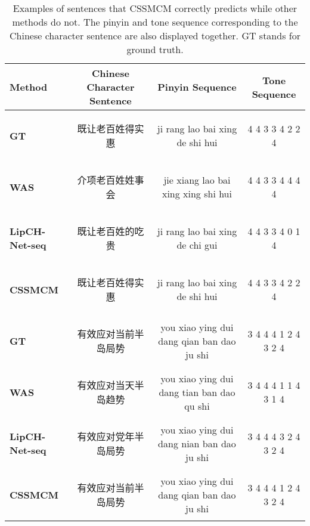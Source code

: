 \documentclass[sigconf]{acmart}
\begin{document}
\begin{table*}[htp]
\small
\centering
\caption {Examples of sentences that CSSMCM correctly predicts while other methods do not. The pinyin and tone sequence corresponding to the Chinese character sentence are also displayed together. GT stands for ground truth.}
\label{table:text_generate}
\begin{tabular}{p{2.7cm}<{\centering}| c | c | c}
\hline
\textbf{Method} & \textbf{Chinese Character Sentence} & \textbf{Pinyin Sequence} & \textbf{Tone Sequence} \\ \hline \hline 

\textbf{GT}   &  \begin{CJK*}{UTF8}{gbsn}既让老百姓得实惠\end{CJK*}   &  ji rang lao bai xing de shi hui     &   4 4 3 3 4 2 2 4  \\ \hline
\textbf{WAS}            &  \begin{CJK*}{UTF8}{gbsn}介项老百姓姓事会\end{CJK*}   &  jie xiang lao bai xing xing shi hui &   4 4 3 3 4 4 4 4\\ \hline
\textbf{LipCH-Net-seq}  &  \begin{CJK*}{UTF8}{gbsn}既让老百姓的吃贵\end{CJK*}   &  ji rang lao bai xing de chi gui     &   4 4 3 3 4 0 1 4\\ \hline
\textbf{CSSMCM}          &  \begin{CJK*}{UTF8}{gbsn}既让老百姓得实惠\end{CJK*}   &  ji rang lao bai xing de shi hui     &   4 4 3 3 4 2 2 4\\ \hline \hline

\textbf{GT}   &  \begin{CJK*}{UTF8}{gbsn}有效应对当前半岛局势\end{CJK*}   &  you xiao ying dui dang qian ban dao ju shi    &   3 4 4 4 1 2 4 3 2 4    \\ \hline
\textbf{WAS}            &  \begin{CJK*}{UTF8}{gbsn}有效应对当天半岛趋势\end{CJK*}   &  you xiao ying dui dang tian ban dao qu shi    &   3 4 4 4 1 1 4 3 1 4    \\ \hline
\textbf{LipCH-Net-seq}  &  \begin{CJK*}{UTF8}{gbsn}有效应对党年半岛局势\end{CJK*}   &  you xiao ying dui dang nian ban dao ju shi    &   3 4 4 4 3 2 4 3 2 4   \\ \hline
\textbf{CSSMCM}          &  \begin{CJK*}{UTF8}{gbsn}有效应对当前半岛局势\end{CJK*}   &  you xiao ying dui dang qian ban dao ju shi    &   3 4 4 4 1 2 4 3 2 4     \\ \hline
\end{tabular}
\end{table*}
\end{document}
